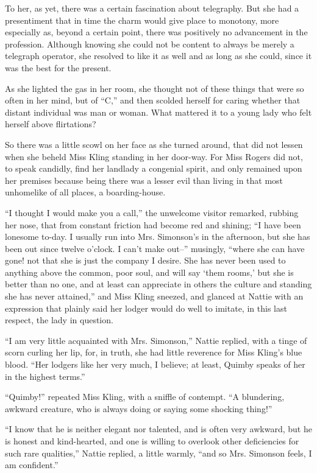 To her, as yet, there was a certain fascination about telegraphy. But
she had a presentiment that in time the charm would give place to
monotony, more especially as, beyond a certain point, there was
positively no advancement in the profession. Although knowing she could
not be content to always be merely a telegraph operator, she resolved to
like it as well and as long as she could, since it was the best for the
present.

As she lighted the gas in her room, she thought not of these things that
were so often in her mind, but of ``C,'' and then scolded herself for
caring whether that distant individual was man or woman. What mattered
it to a young lady who felt herself above flirtations?

So there was a little scowl on her face as she turned around, that did
not lessen when she beheld Miss Kling standing in her door-way. For Miss
Rogers did not, to speak candidly, find her landlady a congenial spirit,
and only remained upon her premises because being there was a lesser
evil than living in that most unhomelike of all places, a
boarding-house.

``I thought I would make you a call,'' the unwelcome visitor remarked,
rubbing her nose, that from constant friction had become red and
shining; ``I have been lonesome to-day. I usually run into Mrs.
Simonson's in the afternoon, but she has been out since twelve o'clock.
I can't make out--'' musingly, ``where she can have gone! not that she is
just the company I desire. She has never been used to anything above the
common, poor soul, and will say `them rooms,' but she is better than no
one, and at least can appreciate in others the culture and standing she
has never attained,'' and Miss Kling sneezed, and glanced at Nattie with
an expression that plainly said her lodger would do well to imitate, in
this last respect, the lady in question.

``I am very little acquainted with Mrs. Simonson,'' Nattie replied, with a
tinge of scorn curling her lip, for, in truth, she had little reverence
for Miss Kling's blue blood. ``Her lodgers like her very much, I believe;
at least, Quimby speaks of her in the highest terms.''

``Quimby!'' repeated Miss Kling, with a sniffle of contempt. ``A
blundering, awkward creature, who is always doing or saying some
shocking thing!''

``I know that he is neither elegant nor talented, and is often very
awkward, but he is honest and kind-hearted, and one is willing to
overlook other deficiencies for such rare qualities,'' Nattie replied, a
little warmly, ``and so Mrs. Simonson feels, I am confident.''

